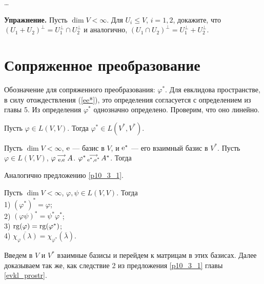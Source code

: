 \ldots
\edok


{\bf Упражнение.}
Пусть $\dim V<\infty$. 
Для $U_i\leq V$, $i=1, 2$, докажите, что $(U_1+U_2)^{\bot} = U_1^{\bot} \cap U_2^{\bot}$
и аналогично, $(U_1\cap U_2)^{\bot} = U_1^{\bot} + U_2^{\bot}$.




\section{Сопряженное преобразование}



Обозначение для сопряженного преобразования: $\varphi^{*}$. 
Для евклидова пространстве, в силу отождествления (\ref{ee*}), это определения согласуется 
с определением из главы 5.
Из  определения $\varphi^{*}$ однозначно определено. Проверим, что оно линейно. 

\begin{predl}\label{p8_9_0}
Пусть $\varphi \in L(V, V)$. Тогда $\varphi^* \in L(V^*, V^*)$. 
\end{predl}
\dok
\edok


\begin{predl}\label{p8_9_1}
Пусть $\dim V<\infty $, $\mathrm{e}$ --- базис в $V$, и $\mathrm{e}^*$ --- его 
взаимный базис в $V^*$. Пусть $\varphi \in L(V, V)$, 
 $\varphi \begin{smallmatrix} \longrightarrow \\ \mathrm{e}, \mathrm{e} \end{smallmatrix} A$. 
$\varphi ^* \begin{smallmatrix} \longrightarrow \\ \mathrm{e}^*, \mathrm{e}^* \end{smallmatrix} A^{*}$. 
Тогда
\end{predl}
\dok
Аналогично предложению \ref{p10_3_1}. 
\edok


\begin{sled1}
Пусть $\dim V <\infty $, $\varphi, \psi \in L(V, V)$. Тогда \\
1) $(\varphi ^{*})^{*} = \varphi$;\\
2) $(\varphi \psi)^{*} = \psi^{*} \varphi^{*}$;\\
3) $\mathop{\rm rg}\nolimits (\varphi) = \mathop{\rm rg}\nolimits (\varphi ^{*})$;\\
4) $\overline{\chi_{\varphi} (\lambda)} = \chi_{\varphi ^{*}} (\overline{\lambda})$.
\end{sled1}
\dok Введем в $V$ и $V^*$ взаимные базисы и перейдем к матрицам в этих базисах. 
Далее доказываем так же, как следствие 2 из предложения \ref{p10_3_1} главы \ref{evkl_prostr}.
\edok

